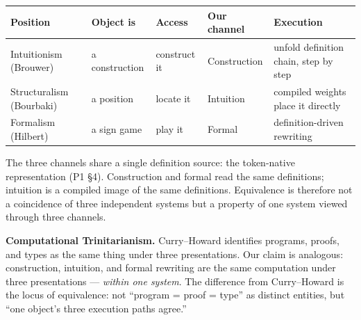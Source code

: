 \documentclass[
]{article}
\begin{document}
\begin{longtable}[]{@{}
  >{\raggedright\arraybackslash}p{}
  >{\raggedright\arraybackslash}p{}
  >{\raggedright\arraybackslash}p{}
  >{\raggedright\arraybackslash}p{}
  >{\raggedright\arraybackslash}p{}@{}}
\toprule\noalign{}
\begin{minipage}[b]{\linewidth}\raggedright
Position
\end{minipage} & \begin{minipage}[b]{\linewidth}\raggedright
Object is
\end{minipage} & \begin{minipage}[b]{\linewidth}\raggedright
Access
\end{minipage} & \begin{minipage}[b]{\linewidth}\raggedright
Our channel
\end{minipage} & \begin{minipage}[b]{\linewidth}\raggedright
Execution
\end{minipage} \\
\midrule\noalign{}
\endhead
\bottomrule\noalign{}
\endlastfoot
Intuitionism (Brouwer) & a construction & construct it & Construction &
unfold definition chain, step by step \\
Structuralism (Bourbaki) & a position & locate it & Intuition & compiled
weights place it directly \\
Formalism (Hilbert) & a sign game & play it & Formal & definition-driven
rewriting \\
\end{longtable}

The three channels share a single definition source: the token-native
representation (P1 §4). Construction and formal read the same
definitions; intuition is a compiled image of the same definitions.
Equivalence is therefore not a coincidence of three independent systems
but a property of one system viewed through three channels.

\textbf{Computational Trinitarianism.} Curry--Howard identifies
programs, proofs, and types as the same thing under three presentations.
Our claim is analogous: construction, intuition, and formal rewriting
are the same computation under three presentations --- \emph{within one
system}. The difference from Curry--Howard is the locus of equivalence:
not ``program = proof = type'' as distinct entities, but ``one object's
three execution paths agree.''
\end{document}
